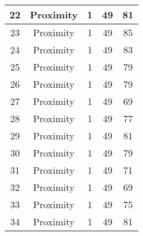 \documentclass[results.tex]{subfiles}
\begin{document}
\begin{center}
\begin{tabular}{| c || c | c | c | c |}
            \hline
            22                      & Proximity                    & 1                      & 49                      & 81                   \\
            \hline
            23                      & Proximity                    & 1                      & 49                      & 85                   \\
            \hline
            24                      & Proximity                    & 1                      & 49                      & 83                   \\
            \hline
            25                      & Proximity                    & 1                      & 49                      & 79                   \\
            \hline
            26                      & Proximity                    & 1                      & 49                      & 79                   \\
            \hline
            27                      & Proximity                    & 1                      & 49                      & 69                   \\
            \hline
            28                      & Proximity                    & 1                      & 49                      & 77                   \\
            \hline
            29                      & Proximity                    & 1                      & 49                      & 81                   \\
            \hline
            30                      & Proximity                    & 1                      & 49                      & 79                   \\
            \hline
            31                      & Proximity                    & 1                      & 49                      & 71                   \\
            \hline
            32                      & Proximity                    & 1                      & 49                      & 69                   \\
            \hline
            33                      & Proximity                    & 1                      & 49                      & 75                   \\
            \hline
            34                      & Proximity                    & 1                      & 49                      & 81                   \\

\end{tabular}
\end{center}
\end{document}
